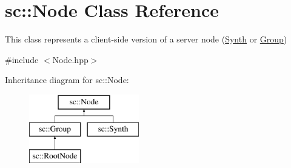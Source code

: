 \hypertarget{classsc_1_1Node}{\section{sc\-:\-:Node Class Reference}
\label{classsc_1_1Node}
}


This class represents a client-\/side version of a server node (\hyperlink{classsc_1_1Synth}{Synth} or \hyperlink{classsc_1_1Group}{Group})  




{\ttfamily \#include $<$Node.\-hpp$>$}

Inheritance diagram for sc\-:\-:Node\-:\begin{figure}[H]
\begin{center}
\leavevmode
\includegraphics[height=3.000000cm]{classsc_1_1Node}
\end{center}
\end{figure}
